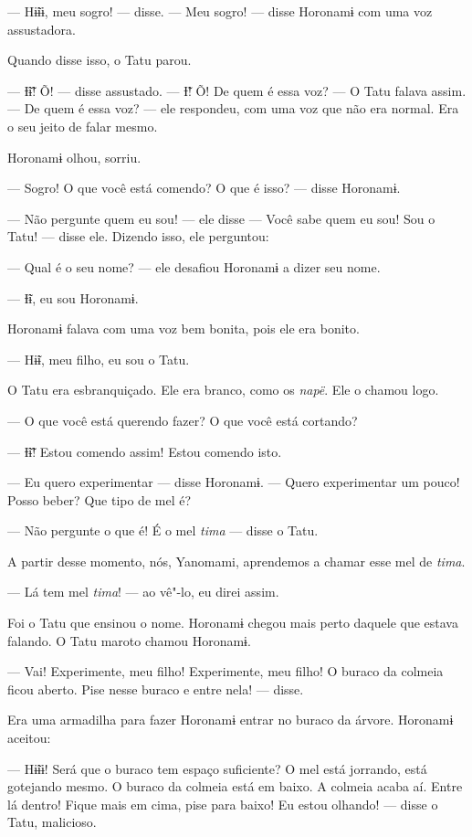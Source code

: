 --- Hɨ̃ɨɨ, meu sogro! --- disse. --- Meu sogro! --- disse Horonamɨ com
uma voz assustadora. 

Quando disse isso, o Tatu parou. 

--- Ɨ̃ɨ̃! Õ! --- disse assustado. --- Ɨ̃! Õ! De quem é essa voz? --- O Tatu
falava assim. --- De quem é essa voz? --- ele respondeu, com uma voz que
não era normal. Era o seu jeito de falar mesmo. 

Horonamɨ olhou, sorriu.

--- Sogro! O que você está comendo? O que é isso? --- disse Horonamɨ. 

--- Não pergunte quem eu sou! --- ele disse --- Você sabe quem eu sou!
Sou o Tatu! --- disse ele. Dizendo isso, ele perguntou: 

--- Qual é o seu nome? --- ele desafiou Horonamɨ a dizer seu nome. 

--- Ɨ̃ɨ, eu sou Horonamɨ. 

Horonamɨ falava com uma voz bem bonita, pois ele era bonito. 

--- Hɨ̃ɨ, meu filho, eu sou o Tatu. 

O Tatu era esbranquiçado. Ele era branco, como os \emph{napë}. Ele o
chamou logo. 

--- O que você está querendo fazer? O que você está cortando? 

--- Ɨ̃ɨ̃! Estou comendo assim! Estou comendo isto.

--- Eu quero experimentar --- disse Horonamɨ. --- Quero experimentar um
pouco! Posso beber? Que tipo de mel é? 

--- Não pergunte o que é! É o mel \emph{tima} --- disse o Tatu. 

A partir desse momento, nós, Yanomami, aprendemos a chamar esse mel
de \emph{tima}. 

--- Lá tem mel \emph{tima}! --- ao vê"-lo, eu direi assim. 

Foi o Tatu que ensinou o nome. Horonamɨ chegou mais perto daquele que
estava falando. O Tatu maroto chamou Horonamɨ. 

--- Vai! Experimente, meu filho! Experimente, meu filho! O buraco da
colmeia ficou aberto. Pise nesse buraco e entre nela! --- disse. 

Era uma armadilha para fazer Horonamɨ entrar no buraco da árvore. Horonamɨ
aceitou: 

--- Hɨ̃ɨɨ! Será que o buraco tem espaço suficiente? O mel está jorrando,
está gotejando mesmo. O buraco da colmeia está em baixo. A colmeia acaba
aí. Entre lá dentro! Fique mais em cima, pise para baixo! Eu estou
olhando! --- disse o Tatu, malicioso. 


